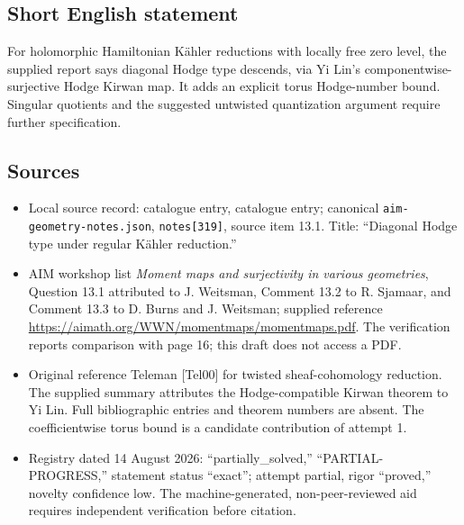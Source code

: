 \documentclass[11pt]{article}
\begin{document}
\subsection{Short English statement}
For holomorphic Hamiltonian K\"ahler reductions with locally free zero level, the supplied report says diagonal Hodge type descends, via Yi Lin's componentwise-surjective Hodge Kirwan map. It adds an explicit torus Hodge-number bound. Singular quotients and the suggested untwisted quantization argument require further specification.
\subsection{Sources}
\begin{itemize}
\item Local source record: catalogue entry, catalogue entry; canonical \texttt{aim-geometry-notes.json}, \texttt{notes[319]}, source item 13.1. Title: ``Diagonal Hodge type under regular K\"ahler reduction.''
\item AIM workshop list \emph{Moment maps and surjectivity in various geometries}, Question 13.1 attributed to J. Weitsman, Comment 13.2 to R. Sjamaar, and Comment 13.3 to D. Burns and J. Weitsman; supplied reference \url{https://aimath.org/WWN/momentmaps/momentmaps.pdf}. The verification reports comparison with page 16; this draft does not access a PDF.
\item Original reference Teleman [Tel00] for twisted sheaf-cohomology reduction. The supplied summary attributes the Hodge-compatible Kirwan theorem to Yi Lin. Full bibliographic entries and theorem numbers are absent. The coefficientwise torus bound is a candidate contribution of attempt 1.
\item Registry dated 14 August 2026: ``partially\_solved,'' ``PARTIAL-PROGRESS,'' statement status ``exact''; attempt partial, rigor ``proved,'' novelty confidence low. The machine-generated, non-peer-reviewed aid requires independent verification before citation.
\end{itemize}
\end{document}

